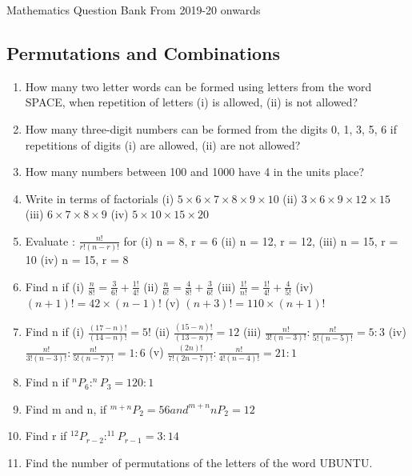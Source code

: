 \documentclass[14pt]{article}
\begin{document}
\centering Mathematics Question Bank From 2019-20 onwards
\begin{multicols}{2}

\section{Permutations and Combinations}
\noindent
\begin{enumerate}
  
\item How many two letter words can be formed
using letters from the word SPACE, when
repetition of letters (i) is allowed, (ii) is not
allowed?
\item How many three-digit numbers can be
formed from the digits 0, 1, 3, 5, 6 if
repetitions of digits (i) are allowed, (ii) are
not allowed?
\item How many numbers between 100 and 1000
have 4 in the units place?
		 
\item Write in terms of factorials
(i)	$5 \times 6 \times 7 \times 8 \times 9 \times 10	$
(ii)	$3 \times 6 \times 9 \times 12 \times 15$
(iii)	$6 \times 7 \times 8 \times 9$
(iv)  $5 \times 10 \times 15 \times 20$

\item 
Evaluate : $\frac{n!}{r!(n-r)!}$ for  (i)	 n = 8, r = 6	 (ii)	 n = 12, r = 12,
	 (iii)	 n = 15, r = 10	 (iv)	 n = 15, r = 8
	 
\item Find n if
(i) $\frac{n}{8!}= \frac{3}{6!}+\frac{1!}{4!}$
(ii) $\frac{n}{6!}= \frac{4}{8!}+\frac{3}{6!}$
(iii) $\frac{1!}{n!}= \frac{1!}{4!}+\frac{4}{5!}$
(iv) $(n+1)!=42 \times (n-1)!$
(v) $(n+3)!=110 \times (n+1)!$

\item Find n if
(i) $\frac{(17-n)!}{(14-n)!}= 5!$
(ii) $\frac{(15-n)!}{(13-n)!}= 12$
(iii) $\frac{n!}{3!(n-3)!}:\frac{n!}{5!(n-5)!}=5:3$
(iv) $\frac{n!}{3!(n-3)!}:\frac{n!}{5!(n-7)!}=1:6$
(v) $\frac{(2n)!}{7!(2n-7)!}:\frac{n!}{4!(n-4)!}=21:1$ 

\item Find n if $^nP_6 : ^nP_3=120:1$

\item Find m and n, if $^{m+n}P_2 = 56 and ^{m+n}nP_2=12$

\item Find r if $^12P_{r-2} : ^11P_{r-1}=3:14$

\item Find the number of permutations of the
letters of the word UBUNTU.


\end{enumerate}
\end{multicols}
\end{document}
